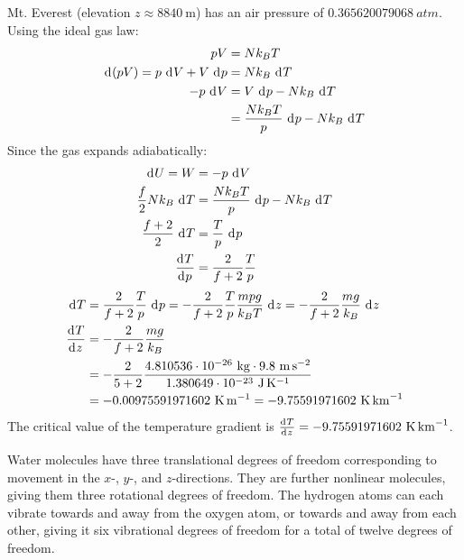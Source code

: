 \documentclass{article}
\begin{document}
Mt. Everest (elevation $z \approx 8840~\unit{\meter}$) has an air pressure of $0.365620079068~\unit{atm}$.
Using the ideal gas law:
\begin{equation}
    \begin{split}
        pV & = Nk_B T \\
        \diff{(pV)} = p \, \diff{V} + V \, \diff{p} & = Nk_B \, \diff{T} \\
        -p \, \diff{V} & = V \, \diff{p} - Nk_B \, \diff{T} \\
        & = \frac{Nk_B T}{p} \, \diff{p} - Nk_B \, \diff{T} \\
    \end{split}
\end{equation}
Since the gas expands adiabatically:
\begin{equation}
    \begin{split}
        \diff{U} = W & = -p \, \diff{V} \\
        \frac{f}{2}Nk_B \, \diff{T} & = \frac{Nk_B T}{p} \, \diff{p} - Nk_B \, \diff{T} \\
        \frac{f + 2}{2} \, \diff{T} & = \frac{T}{p} \, \diff{p} \\
        \deriv{T}{p} & = \frac{2}{f + 2}\frac{T}{p}
    \end{split}
\end{equation}
\begin{equation}
    \begin{split}
        \diff{T} & = \frac{2}{f + 2}\frac{T}{p} \, \diff{p} = -\frac{2}{f + 2}\frac{T}{p}\frac{mpg}{k_B T} \, \diff{z} = -\frac{2}{f + 2}\frac{mg}{k_B} \, \diff{z} \\
        \deriv{T}{z} & = -\frac{2}{f + 2}\frac{mg}{k_B} \\
        & = -\frac{2}{5 + 2}\frac{4.810536 \cdot 10^{-26}~\unit{\kilo\gram} \cdot 9.8~\unit{\meter\per\second\squared}}{1.380649 \cdot 10^{-23}~\unit{\joule\per\kelvin}} \\
        & = -0.00975591971602~\unit{\kelvin\per\meter} = -9.75591971602~\unit{\kelvin\per\kilo\meter}
    \end{split}
\end{equation}
The critical value of the temperature gradient is $\deriv{T}{z}= -9.75591971602~\unit{\kelvin\per\kilo\meter}$.

\clearpage

Water molecules have three translational degrees of freedom corresponding to movement in the $x$-, $y$-, and $z$-directions. They are further nonlinear molecules, giving them three rotational degrees of freedom. The hydrogen atoms can each vibrate towards and away from the oxygen atom, or towards and away from each other, giving it six vibrational degrees of freedom for a total of twelve degrees of freedom.
\end{document}

